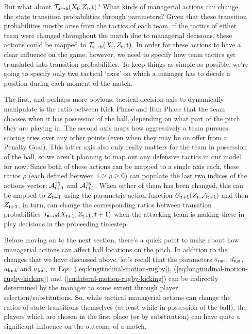 But what about ${\cal T}_{{\sf a}\rightarrow {\sf b}}(X_{\sf t},Z_{\sf t},{\sf t})$? What kinds of managerial actions can change the state transition probabilities through parameters? Given that these transition probabilities mostly arise from the tactics of each team, if the tactics of either team were changed throughout the match due to managerial decisions, these actions could be mapped to ${\cal T}_{{\sf a}\rightarrow {\sf b}}(X_{\sf t},Z_{\sf t},{\sf t})$. In order for these actions to have a clear influence on the game, however, we need to specify how team tactics get translated into transition probabilities. To keep things as simple as possible, we're going to specify only two tactical `axes' on which a manager has to decide a position during each moment of the match.

The first, and perhaps more obvious, tactical decision axis to dynamically manipulate is the ratio between {\sf Kick Phase} and {\sf Run Phase} that the team chooses when it has possession of the ball, depending on what part of the pitch they are playing in. The second axis maps how aggressively a team pursues scoring tries over any other points (even when they may be on offer from a {\sf Penalty Goal}). This latter axis also only really matters for the team in possession of the ball, so we aren't planning to map out any defensive tactics in our model for now. Since both of these actions can be mapped to a single axis each, these ratios $\rho$ (each defined between $1\geq \rho \geq 0$) can populate the last two indices of the actions vector: ${\cal A}^{15}_{{\sf t}+1}$ and ${\cal A}^{16}_{{\sf t}+1}$. When either of them has been changed, this can be mapped to $Z_{{\sf t}+1}$ using the parametric action function $G_{{\sf t}+1}(Z_{\sf t},{\cal A}_{{\sf t}+1})$ and then $Z_{{\sf t}+1}$, in turn, can change the corresponding ratios between transition probabilities ${\cal T}_{{\sf a}\rightarrow {\sf b}}(X_{{\sf t}+1},Z_{{\sf t}+1},{\sf t}+1)$ when the attacking team is making these in-play decisions in the proceeding timestep.

Before moving on to the next section, there's a quick point to make about how managerial actions can affect ball locations on the pitch. In addition to the changes that we have discussed above, let's recall that the parameters $a_{\sf run}$, $d_{\sf run}$, $a_{\rm kick}$ and $\sigma_{\rm kick}$ in Eqs.~(\ref{eq:longitudinal-motion-rugby}), (\ref{eq:longitudinal-motion-rugby-kicking}) and (\ref{eq:lateral-motion-rugby-kicking}) can be indirectly determined by the manager to some extent through player selection/substitutions. So, while tactical managerial actions can change the ratios of state transitions themselves (at least while in possession of the ball), the players which are chosen in the first place (or by substitution) can have quite a significant influence on the outcome of a match.

